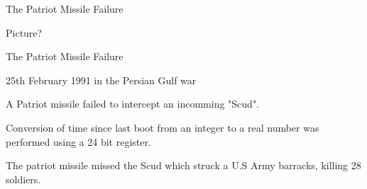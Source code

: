 \documentclass[13pt]{beamer}
\begin{document}
\begin{frame}{The Patriot Missile Failure}
  \begin{block}{}
    Picture?
  \end{block}

\end{frame}

\begin{frame}{The Patriot Missile Failure}
  \begin{block}{}
    25th February 1991 in the Persian Gulf war
  \end{block}

  \pause

  \begin{block}{}
     A Patriot missile failed to intercept an incomming "Scud".
  \end{block}

  \pause

  \begin{block}{}
     Conversion of time since last boot from an integer to a real number was performed using a 24 bit register.
  \end{block}

  \pause

  \begin{block}{}
     The patriot missile missed the Scud which struck a U.S Army barracks, killing 28 soldiers.
  \end{block}

\end{frame}
\end{document}

